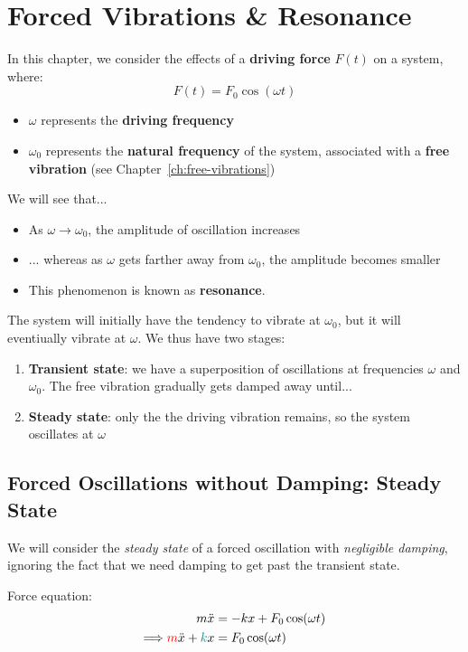 \chapter{Forced Vibrations \& Resonance}


	In this chapter, we consider the effects of a \textbf{driving force} $F(t)$ on a system, where:
	\[ {F(t) = F_0 \cos(\omega t)} \]
	\begin{itemize}
		\item $\omega$ represents the \textbf{driving frequency}
		\item $\omega_0$ represents the \textbf{natural frequency} of the system, associated with a \textbf{free vibration} (see Chapter~\ref{ch:free-vibrations})
	\end{itemize}



We will see that...
\begin{itemize}
	\item As $\omega \to \omega_0$, the amplitude of oscillation increases
	\item ... whereas as $\omega$ gets farther away from $\omega_0$, the amplitude becomes smaller
	\item This phenomenon is known as \textbf{resonance}.
\end{itemize}

The system will initially have the tendency to vibrate at $\omega_0$, but it will eventiually vibrate at $\omega$. We thus have two stages:
\begin{enumerate}
	\item \textbf{Transient state}: we have a superposition of oscillations at frequencies $\omega$ and $\omega_0$. The free vibration gradually gets damped away until...
	\item \textbf{Steady state}: only the the driving vibration remains, so the system oscillates at $\omega$
\end{enumerate}

\section{Forced Oscillations without Damping: Steady State}
We will consider the \emph{steady state} of a forced oscillation with \emph{negligible damping}, ignoring the fact that we need damping to get past the transient state.

Force equation:
\begin{align}
	m\ddot{x} &= -kx + F_0 \cos(\omega t)  \notag \\
	\Longrightarrow
	\textcolor{red}{m}\ddot{x} + \textcolor{teal}{k}x &= F_0 \cos(\omega t)	\label{ch4:eq-no-b}
\end{align}

